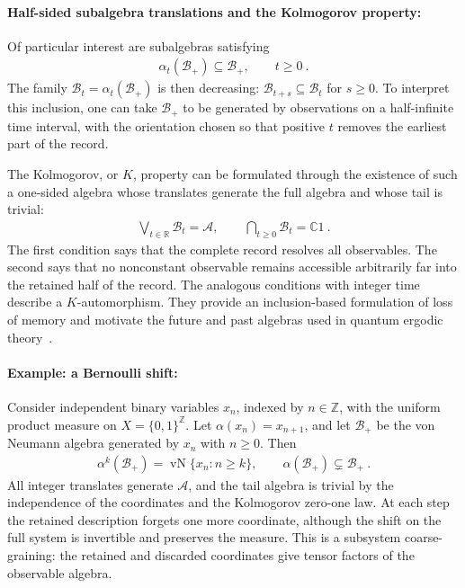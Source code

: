 \documentclass[a4paper,11pt]{article}
\theoremstyle{definition}
\newcommand{\mA}{\mathcal{A}}
\newcommand{\mB}{\mathcal{B}}
\begin{document}


\paragraph{Half-sided subalgebra translations and the Kolmogorov property:}
Of particular interest are subalgebras satisfying
\begin{align}\label{eq:classical-one-sided-inclusion}
    \alpha_t(\mB_+)\subseteq\mB_+,\qquad t\geq0\ .
\end{align}
The family $\mB_t=\alpha_t(\mB_+)$ is then decreasing: $\mB_{t+s}\subseteq\mB_t$ for $s\geq0$. To interpret this inclusion, one can take $\mB_+$ to be generated by observations on a half-infinite time interval, with the orientation chosen so that positive $t$ removes the earliest part of the record.

The Kolmogorov, or $K$, property can be formulated through the existence of such a one-sided algebra whose translates generate the full algebra and whose tail is trivial:
\begin{align}\label{eq:classical-K-algebra}
    \bigvee_{t\in\mathbb R}\mB_t=\mA,
    \qquad
    \bigcap_{t\geq0}\mB_t=\mathbb C1\ .
\end{align}
The first condition says that the complete record resolves all observables. The second says that no nonconstant observable remains accessible arbitrarily far into the retained half of the record. The analogous conditions with integer time describe a $K$-automorphism. They provide an inclusion-based formulation of loss of memory and motivate the future and past algebras used in quantum ergodic theory~\cite{ouseph2024local}.

\paragraph{Example: a Bernoulli shift:}
Consider independent binary variables $x_n$, indexed by $n\in\mathbb Z$, with the uniform product measure on $X=\{0,1\}^{\mathbb Z}$. Let $\alpha(x_n)=x_{n+1}$, and let $\mB_+$ be the von Neumann algebra generated by $x_n$ with $n\geq0$. Then
\begin{align}
    \alpha^k(\mB_+)
    =\operatorname{vN}\{x_n:n\geq k\},
    \qquad
    \alpha(\mB_+)\subsetneq\mB_+\ .
\end{align}
All integer translates generate $\mA$, and the tail algebra is trivial by the independence of the coordinates and the Kolmogorov zero-one law. At each step the retained description forgets one more coordinate, although the shift on the full system is invertible and preserves the measure. This is a subsystem coarse-graining: the retained and discarded coordinates give tensor factors of the observable algebra.
\end{document}
